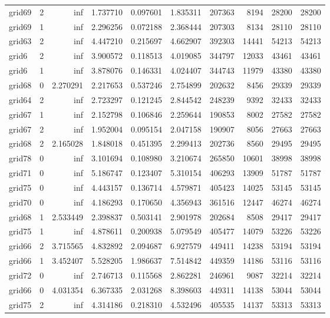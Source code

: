 \begin{longtable}{|l|r|r|r|r|r|r|r|r|r|}
grid69 & 2 & inf & 1.737710 & 0.097601 & 1.835311 & 207363 & 8194 & 28200 & 28200 \\
grid69 & 1 & inf & 2.296256 & 0.072188 & 2.368444 & 207303 & 8134 & 28110 & 28110 \\
grid63 & 2 & inf & 4.447210 & 0.215697 & 4.662907 & 392303 & 14441 & 54213 & 54213 \\
grid6 & 2 & inf & 3.900572 & 0.118513 & 4.019085 & 344797 & 12033 & 43461 & 43461 \\
grid6 & 1 & inf & 3.878076 & 0.146331 & 4.024407 & 344743 & 11979 & 43380 & 43380 \\
grid68 & 0 & 2.270291 & 2.217653 & 0.537246 & 2.754899 & 202632 & 8456 & 29339 & 29339 \\
grid64 & 2 & inf & 2.723297 & 0.121245 & 2.844542 & 248239 & 9392 & 32433 & 32433 \\
grid67 & 1 & inf & 2.152798 & 0.106846 & 2.259644 & 190853 & 8002 & 27582 & 27582 \\
grid67 & 2 & inf & 1.952004 & 0.095154 & 2.047158 & 190907 & 8056 & 27663 & 27663 \\
grid68 & 2 & 2.165028 & 1.848018 & 0.451395 & 2.299413 & 202736 & 8560 & 29495 & 29495 \\
grid78 & 0 & inf & 3.101694 & 0.108980 & 3.210674 & 265850 & 10601 & 38998 & 38998 \\
grid71 & 0 & inf & 5.186747 & 0.123407 & 5.310154 & 406293 & 13909 & 51787 & 51787 \\
grid75 & 0 & inf & 4.443157 & 0.136714 & 4.579871 & 405423 & 14025 & 53145 & 53145 \\
grid70 & 0 & inf & 4.186293 & 0.170650 & 4.356943 & 361516 & 12447 & 46274 & 46274 \\
grid68 & 1 & 2.533449 & 2.398837 & 0.503141 & 2.901978 & 202684 & 8508 & 29417 & 29417 \\
grid75 & 1 & inf & 4.878611 & 0.200938 & 5.079549 & 405477 & 14079 & 53226 & 53226 \\
grid66 & 2 & 3.715565 & 4.832892 & 2.094687 & 6.927579 & 449411 & 14238 & 53194 & 53194 \\
grid66 & 1 & 3.452407 & 5.528205 & 1.986637 & 7.514842 & 449359 & 14186 & 53116 & 53116 \\
grid72 & 0 & inf & 2.746713 & 0.115568 & 2.862281 & 246961 & 9087 & 32214 & 32214 \\
grid66 & 0 & 4.031354 & 6.367335 & 2.031268 & 8.398603 & 449311 & 14138 & 53044 & 53044 \\
grid75 & 2 & inf & 4.314186 & 0.218310 & 4.532496 & 405535 & 14137 & 53313 & 53313 \\

\end{longtable}
